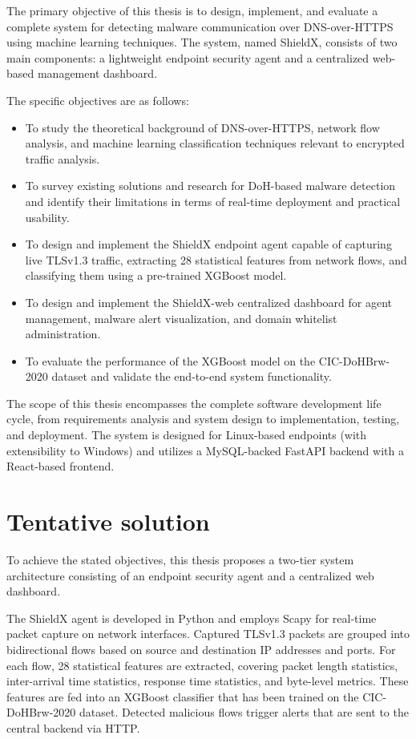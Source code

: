 \documentclass[../Main.tex]{subfiles}
\begin{document}
The primary objective of this thesis is to design, implement, and evaluate a complete system for detecting malware communication over DNS-over-HTTPS using machine learning techniques. The system, named ShieldX, consists of two main components: a lightweight endpoint security agent and a centralized web-based management dashboard.

The specific objectives are as follows:
\begin{itemize}
    \item To study the theoretical background of DNS-over-HTTPS, network flow analysis, and machine learning classification techniques relevant to encrypted traffic analysis.
    \item To survey existing solutions and research for DoH-based malware detection and identify their limitations in terms of real-time deployment and practical usability.
    \item To design and implement the ShieldX endpoint agent capable of capturing live TLSv1.3 traffic, extracting 28 statistical features from network flows, and classifying them using a pre-trained XGBoost model.
    \item To design and implement the ShieldX-web centralized dashboard for agent management, malware alert visualization, and domain whitelist administration.
    \item To evaluate the performance of the XGBoost model on the CIC-DoHBrw-2020 dataset and validate the end-to-end system functionality.
\end{itemize}

The scope of this thesis encompasses the complete software development life cycle, from requirements analysis and system design to implementation, testing, and deployment. The system is designed for Linux-based endpoints (with extensibility to Windows) and utilizes a MySQL-backed FastAPI backend with a React-based frontend.

\section{Tentative solution}
\label{section:1.3}

To achieve the stated objectives, this thesis proposes a two-tier system architecture consisting of an endpoint security agent and a centralized web dashboard.

The ShieldX agent is developed in Python and employs Scapy for real-time packet capture on network interfaces. Captured TLSv1.3 packets are grouped into bidirectional flows based on source and destination IP addresses and ports. For each flow, 28 statistical features are extracted, covering packet length statistics, inter-arrival time statistics, response time statistics, and byte-level metrics. These features are fed into an XGBoost classifier that has been trained on the CIC-DoHBrw-2020 dataset. Detected malicious flows trigger alerts that are sent to the central backend via HTTP.
\end{document}
